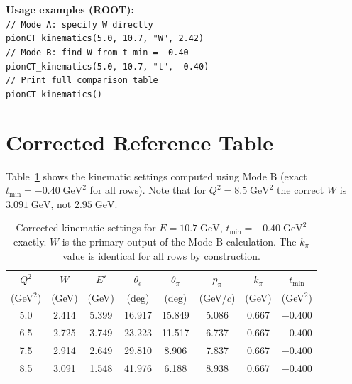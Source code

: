 \documentclass[12pt,a4paper]{article}
\begin{document}
\begin{codebox}
\textbf{Usage examples (ROOT):}\\[4pt]
\texttt{// Mode A: specify W directly}\\
\texttt{pionCT\_kinematics(5.0, 10.7, "W", 2.42)}\\[4pt]
\texttt{// Mode B: find W from t\_min = -0.40}\\
\texttt{pionCT\_kinematics(5.0, 10.7, "t", -0.40)}\\[4pt]
\texttt{// Print full comparison table}\\
\texttt{pionCT\_kinematics()}
\end{codebox}

\section{Corrected Reference Table}

Table~\ref{tab:corrected} shows the kinematic settings computed using Mode B
(exact $t_\text{min} = -0.40\;\text{GeV}^2$ for all rows). Note that for
$Q^2 = 8.5\;\text{GeV}^2$ the correct $W$ is $3.091\;\text{GeV}$, not
$2.95\;\text{GeV}$.

\begin{table}[h!]
\centering
\caption{Corrected kinematic settings for $E = 10.7\;\text{GeV}$,
$t_\text{min} = -0.40\;\text{GeV}^2$ exactly. $W$ is the primary output
of the Mode B calculation. The $k_\pi$ value is identical for all rows
by construction.}
\label{tab:corrected}
\begin{tabular}{cccccccc}
\toprule
$Q^2$ & $W$ & $E'$ & $\theta_e$ & $\theta_\pi$ & $p_\pi$ & $k_\pi$ & $t_\text{min}$ \\
(GeV$^2$) & (GeV) & (GeV) & (deg) & (deg) & (GeV/$c$) & (GeV) & (GeV$^2$) \\
\midrule
5.0 & 2.414 & 5.399 & 16.917 & 15.849 & 5.086 & 0.667 & $-0.400$ \\
6.5 & 2.725 & 3.749 & 23.223 & 11.517 & 6.737 & 0.667 & $-0.400$ \\
7.5 & 2.914 & 2.649 & 29.810 &  8.906 & 7.837 & 0.667 & $-0.400$ \\
8.5 & 3.091 & 1.548 & 41.976 &  6.188 & 8.938 & 0.667 & $-0.400$ \\
\bottomrule
\end{tabular}
\end{table}

\end{document}
